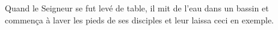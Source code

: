Quand le Seigneur se fut levé de table, il mit de l’eau dans un bassin et commença à laver les pieds de ses disciples et leur laissa ceci en exemple.